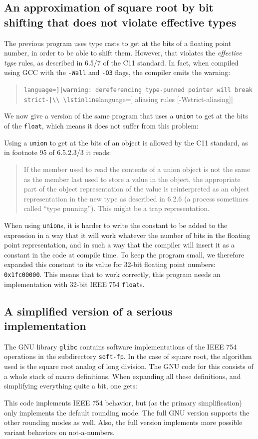 \documentclass{article}
\begin{document}
\subsection{An approximation of square root by bit shifting that does not violate effective types}\label{sqrt3}
The previous program uses type casts to get at the bits of a floating point number,
in order to be able to shift them.
However, that violates the \emph{effective type} rules, as described
in 6.5/7 of the C11 standard.
In fact, when compiled using GCC with the \lstinline|-Wall| and \lstinline|-O3| flags,
the compiler emits the warning:
\begin{quote}
\lstinline[language=]|warning: dereferencing type-punned pointer will break strict-|\\
\lstinline[language=]|aliasing rules [-Wstrict-aliasing]|
\end{quote}
We now give a version of the same program that uses a \lstinline|union| to
get at the bits of the \lstinline|float|, which means it
does not suffer from this problem:

Using a \lstinline|union| to get at the bits of an object is allowed by the C11 standard, as in
footnote 95 of 6.5.2.3/3 it reads:
\begin{quote}
If the member used to read the contents of a union object is not the same as the member last used to
store a value in the object, the appropriate part of the object representation of the value is reinterpreted
as an object representation in the new type as described in 6.2.6 (a process sometimes called ``type
punning''). This might be a trap representation.
\end{quote}
When using \lstinline|union|s, it is harder to write the constant to be
added to the expression in a way that it will work whatever
the number of bits in the floating point representation, and
in such a way that the compiler will insert it as a constant in the code
at compile time.
To keep the program small, we therefore expanded this constant to its value for 32-bit
floating point numbers: \lstinline|0x1fc00000|. %
This means that to work correctly, this program needs an implementation with 32-bit IEEE 754 \lstinline|float|s.

\subsection{A simplified version of a serious implementation}
The GNU library \texttt{glibc} contains software implementations of
the IEEE 754 operations in the subdirectory \texttt{soft-fp}.
In the case of square root, the algorithm used is the square root
analog of long division.
The GNU code for this consists of a whole stack of macro definitions.
When expanding all these definitions, and simplifying everything quite a bit, one gets:

This code implements IEEE 754 behavior, but (as the primary simplification)
only implements the default rounding mode.
The full GNU version supports the other rounding modes as well.
Also, the full version implements more possible variant behaviors on not-a-numbers.
\end{document}

